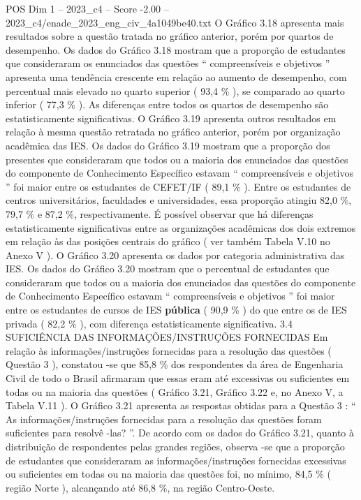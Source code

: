 \begin{textsample}{POS Dim 1 – 2023\_c4 – Score -2.00 – 2023\_c4/enade\_2023\_eng\_civ\_4a1049be40.txt}
O Gráfico 3.18 apresenta mais resultados sobre a questão tratada no gráfico anterior, porém por quartos de desempenho.
Os dados do Gráfico 3.18 mostram que a proporção de estudantes que consideraram os enunciados das questões “ compreensíveis e objetivos ” apresenta uma tendência crescente em relação ao aumento de desempenho, com percentual mais elevado no quarto superior ( 93,4 \% ), se comparado ao quarto inferior ( 77,3 \% ).
As diferenças entre todos os quartos de desempenho são estatisticamente significativas.
O Gráfico 3.19 apresenta outros resultados em relação à mesma questão retratada no gráfico anterior, porém por organização acadêmica das IES.
Os dados do Gráfico 3.19 mostram que a proporção dos presentes que consideraram que todos ou a maioria dos enunciados das questões do componente de Conhecimento Específico estavam “ compreensíveis e objetivos ” foi maior entre os estudantes de CEFET/IF ( 89,1 \% ).
Entre os estudantes de centros universitários, faculdades e universidades, essa proporção atingiu 82,0 \%, 79,7 \% e 87,2 \%, respectivamente.
É possível observar que há diferenças estatisticamente significativas entre as organizações acadêmicas dos dois extremos em relação às das posições centrais do gráfico ( ver também Tabela V.10 no Anexo V ).
O Gráfico 3.20 apresenta os dados por categoria administrativa das IES.
Os dados do Gráfico 3.20 mostram que o percentual de estudantes que consideraram que todos ou a maioria dos enunciados das questões do componente de Conhecimento Específico estavam “ compreensíveis e objetivos ” foi maior entre os estudantes de cursos de IES \textbf{pública} ( 90,9 \% ) do que entre os de IES privada ( 82,2 \% ), com diferença estatisticamente significativa. 3.4 SUFICIÊNCIA DAS INFORMAÇÕES/INSTRUÇÕES FORNECIDAS Em relação às informações/instruções fornecidas para a resolução das questões ( Questão 3 ), constatou -se que 85,8 \% dos respondentes da área de Engenharia Civil de todo o Brasil afirmaram que essas eram até excessivas ou suficientes em todas ou na maioria das questões ( Gráfico 3.21, Gráfico 3.22 e, no Anexo V, a Tabela V.11 ).
O Gráfico 3.21 apresenta as respostas obtidas para a Questão 3 : “ As informações/instruções fornecidas para a resolução das questões foram suficientes para resolvê -las? ”.
De acordo com os dados do Gráfico 3.21, quanto à distribuição de respondentes pelas grandes regiões, observa -se que a proporção de estudantes que consideraram as informações/instruções fornecidas excessivas ou suficientes em todas ou na maioria das questões foi, no mínimo, 84,5 \% ( região Norte ), alcançando até 86,8 \%, na região Centro-Oeste.

\end{textsample}
